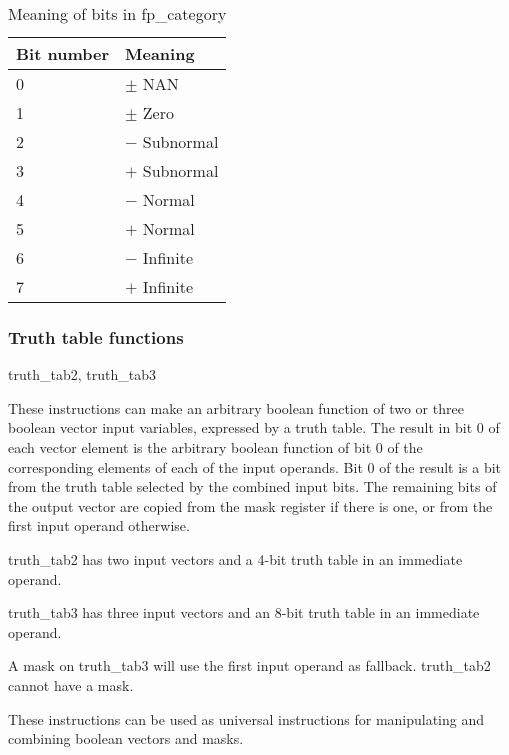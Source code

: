 \documentclass[forwardcom.tex]{subfiles}
\begin{document}
\begin{longtable} {|p{20mm}|p{90mm}|}
\caption{Meaning of bits in fp\_category} 
\label{table:fpCategoryInstructionBits} \\
\endfirsthead
\endhead
\hline
\bfseries Bit number & \bfseries Meaning  \\
\hline
0 & $\pm$ NAN \\
1 & $\pm$ Zero \\
2 & $-$ Subnormal \\
3 & $+$ Subnormal \\
4 & $-$ Normal \\
5 & $+$ Normal \\
6 & $-$ Infinite  \\
7 & $+$ Infinite  \\
\hline
\end{longtable}
  

\subsubsection{Truth table functions} \label{truthTableFunctions}
truth\_tab2, truth\_tab3
\vspace{2mm}

These instructions can make an arbitrary boolean function of two or three boolean vector input variables, expressed by a truth table. The result in bit 0 of each vector element is the arbitrary boolean function of bit 0 of the corresponding elements of each of the input operands. Bit 0 of the result is a bit from the truth table selected by the combined input bits. The remaining bits of the output vector are copied from the mask register if there is one, or from the first input operand otherwise. 
\vspace{2mm}

truth\_tab2 has two input vectors and a 4-bit truth table in an immediate operand.
\vspace{2mm}

truth\_tab3 has three input vectors and an 8-bit truth table in an immediate operand.
\vspace{2mm}

A mask on truth\_tab3 will use the first input operand as fallback. truth\_tab2 cannot have a mask.
\vspace{2mm}

These instructions can be used as universal instructions for manipulating and combining boolean vectors and masks.
\vspace{2mm}
\end{document}
